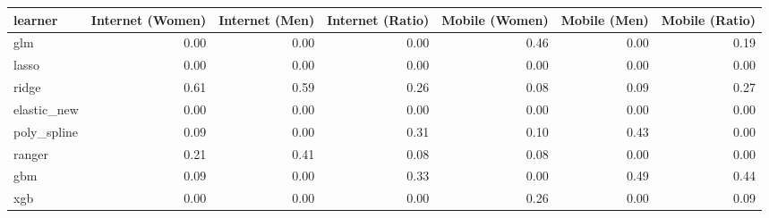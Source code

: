 \begin{table}[ht]
\centering
\begin{tabular}{lrrrrrr}
  \toprule
learner & Internet (Women) & Internet (Men) & Internet (Ratio) & Mobile (Women) & Mobile (Men) & Mobile (Ratio) \\ 
  \midrule
glm & 0.00 & 0.00 & 0.00 & 0.46 & 0.00 & 0.19 \\ 
  lasso & 0.00 & 0.00 & 0.00 & 0.00 & 0.00 & 0.00 \\ 
  ridge & 0.61 & 0.59 & 0.26 & 0.08 & 0.09 & 0.27 \\ 
  elastic\_new & 0.00 & 0.00 & 0.00 & 0.00 & 0.00 & 0.00 \\ 
  poly\_spline & 0.09 & 0.00 & 0.31 & 0.10 & 0.43 & 0.00 \\ 
  ranger & 0.21 & 0.41 & 0.08 & 0.08 & 0.00 & 0.00 \\ 
  gbm & 0.09 & 0.00 & 0.33 & 0.00 & 0.49 & 0.44 \\ 
  xgb & 0.00 & 0.00 & 0.00 & 0.26 & 0.00 & 0.09 \\ 
   \bottomrule
\end{tabular}
\end{table}
